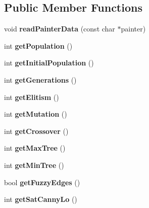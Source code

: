 \subsection*{Public Member Functions}
\begin{DoxyCompactItemize}
\item 
\hypertarget{classConfigReader_a0e567ddb371432f0c6bd5fa472304970}{}\label{classConfigReader_a0e567ddb371432f0c6bd5fa472304970} 
void {\bfseries read\+Painter\+Data} (const char $\ast$painter)
\item 
\hypertarget{classConfigReader_ad2c2a7bfc19b76357dc91d9def4c7992}{}\label{classConfigReader_ad2c2a7bfc19b76357dc91d9def4c7992} 
int {\bfseries get\+Population} ()
\item 
\hypertarget{classConfigReader_a5c2411ee0c0677015b9655dc7360c97e}{}\label{classConfigReader_a5c2411ee0c0677015b9655dc7360c97e} 
int {\bfseries get\+Initial\+Population} ()
\item 
\hypertarget{classConfigReader_a50cb73d4e053df9a16c16a6a650da147}{}\label{classConfigReader_a50cb73d4e053df9a16c16a6a650da147} 
int {\bfseries get\+Generations} ()
\item 
\hypertarget{classConfigReader_aaf6399eb399499490eae48fe29fe99eb}{}\label{classConfigReader_aaf6399eb399499490eae48fe29fe99eb} 
int {\bfseries get\+Elitism} ()
\item 
\hypertarget{classConfigReader_a9bb987d15fa1f2d13f7ada58e03e0a43}{}\label{classConfigReader_a9bb987d15fa1f2d13f7ada58e03e0a43} 
int {\bfseries get\+Mutation} ()
\item 
\hypertarget{classConfigReader_a1e2ade167d3e28489b4e2dc37242b8fd}{}\label{classConfigReader_a1e2ade167d3e28489b4e2dc37242b8fd} 
int {\bfseries get\+Crossover} ()
\item 
\hypertarget{classConfigReader_ae707de59f1e1c32bfa8f4961247758f6}{}\label{classConfigReader_ae707de59f1e1c32bfa8f4961247758f6} 
int {\bfseries get\+Max\+Tree} ()
\item 
\hypertarget{classConfigReader_ac8b0ed0d215cfbdb595f9ca91db0bc5c}{}\label{classConfigReader_ac8b0ed0d215cfbdb595f9ca91db0bc5c} 
int {\bfseries get\+Min\+Tree} ()
\item 
\hypertarget{classConfigReader_a48f25599934dd6a80694e312139d7fa8}{}\label{classConfigReader_a48f25599934dd6a80694e312139d7fa8} 
bool {\bfseries get\+Fuzzy\+Edges} ()
\item 
\hypertarget{classConfigReader_abc7d4bab01a5e1eeabb30e185a230455}{}\label{classConfigReader_abc7d4bab01a5e1eeabb30e185a230455} 
int {\bfseries get\+Sat\+Canny\+Lo} ()

\end{DoxyCompactItemize}
